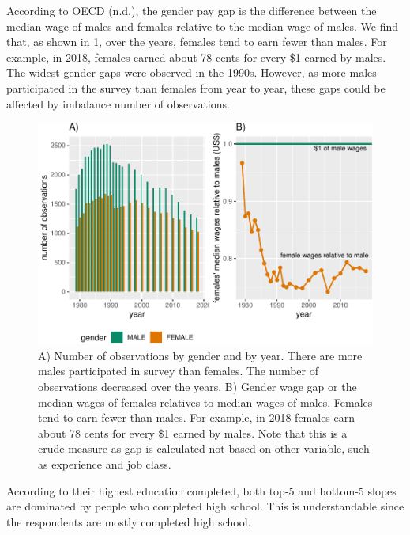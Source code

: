 \documentclass{article}
\begin{document}
According to OECD (n.d.), the gender pay gap is the difference between the median wage of males and females relative to the median wage of males. We find that, as shown in \ref{fig:gap-gender}, over the years, females tend to earn fewer than males. For example, in 2018, females earned about 78 cents for every \$1 earned by males. The widest gender gaps were observed in the 1990s. However, as more males participated in the survey than females from year to year, these gaps could be affected by imbalance number of observations.

\begin{figure}

{\centering \includegraphics[width=0.9\linewidth]{figures/gap-gender-1} 

}

\caption{A) Number of observations by gender and by year. There are more males participated in survey than females. The number of observations decreased over the years. B) Gender wage gap or the median wages of females relatives to median wages of males. Females tend to earn fewer than males. For example, in 2018 females earn about 78 cents for every \$1 earned by males. Note that this is a crude measure as gap is calculated not based on other variable, such as experience and job class.}\label{fig:gap-gender}
\end{figure}

According to their highest education completed, both top-5 and bottom-5 slopes are dominated by people who completed high school. This is understandable since the respondents are mostly completed high school.
\end{document}
